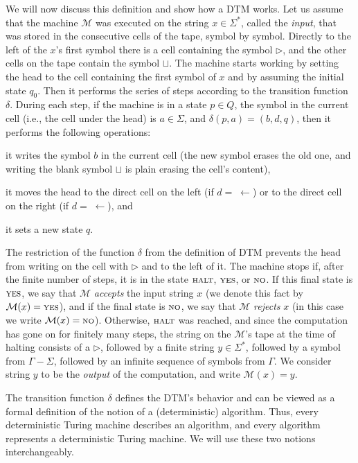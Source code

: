 We will now discuss this definition and show how a DTM works.
Let us assume that the machine $\mathcal{M}$ was executed on the string $x\in\Sigma^*$, called the \emph{input}, that was stored in the consecutive cells of the tape, symbol by symbol.
Directly to the left of the $x$'s first symbol there is a cell containing the symbol $\rhd$, and the other cells on the tape contain the symbol $\sqcup$.
The machine starts working by setting the head to the cell containing the first symbol of $x$ and by assuming the initial state $q_0$.
Then it performs the series of steps according to the transition function $\delta$.
During each step, if the machine is in a state $p\in Q$, the symbol in the current cell (i.e., the cell under the head) is $a\in\Sigma$, and $\delta(p,a)=(b,d,q)$, then it performs the following operations:
\begin{Enumerate}
	\item it writes the symbol $b$ in the current cell (the new symbol erases the old one, and writing the blank symbol $\sqcup$ is plain erasing the cell's content),
	\item it moves the head to the direct cell on the left (if $d=\;\leftarrow$) or to the direct cell on the right (if $d=\;\leftarrow$), and
	\item it sets a new state $q$.
\end{Enumerate}
The restriction of the function $\delta$ from the definition of DTM prevents the head from writing on the cell with $\rhd$ and to the left of it.
The machine stops if, after the finite number of steps, it is in the state ${\scriptstyle\rm HALT}$, ${\scriptstyle\rm YES}$, or ${\scriptstyle\rm NO}$.
If this final state is ${\scriptstyle\rm YES}$, we say that $\mathcal{M}$ \emph{accepts} the input string $x$ (we denote this fact by $\mathcal{M}(x)={\scriptstyle\rm YES}$), and if the final state is ${\scriptstyle\rm NO}$, we say that $\mathcal{M}$ \emph{rejects} $x$ (in this case we write $\mathcal{M}(x)={\scriptstyle\rm NO}$).
Otherwise, ${\scriptstyle\rm HALT}$ was reached, and since the computation has gone on for finitely many steps, the string on the $\mathcal{M}$'s tape at the time of halting consists of a $\rhd$, followed by a finite string $y\in\Sigma^*$, followed by a symbol from $\Gamma-\Sigma$, followed by an infinite sequence of symbols from $\Gamma$.
We consider string $y$ to be the \emph{output} of the computation, and write $\mathcal{M}(x)=y$.

The transition function $\delta$ defines the DTM's behavior and can be viewed as a formal definition of the notion of a (deterministic) algorithm.
Thus, every deterministic Turing machine describes an algorithm, and every algorithm represents a deterministic Turing machine.
We will use these two notions interchangeably.

